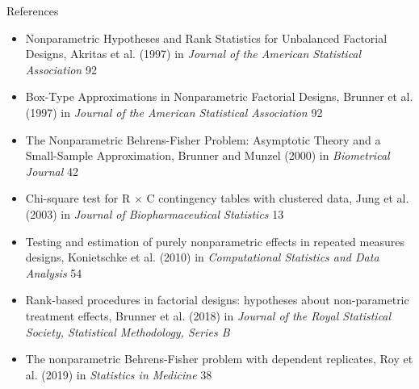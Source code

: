 \documentclass[xcolor=dvipsnames, aspectratio = 169]{beamer}
\begin{document}
\begin{frame}[fragile]{References}
	\begin{itemize}
	\setlength\itemsep{0em}
	\footnotesize
		\item Nonparametric Hypotheses and Rank Statistics for Unbalanced Factorial Designs, Akritas et al. (1997) in \textit{Journal of the American Statistical Association} 92
		\item Box-Type Approximations in Nonparametric Factorial Designs, Brunner et al. (1997) in \textit{Journal of the American Statistical Association} 92
		\item The Nonparametric Behrens-Fisher Problem: Asymptotic Theory and a Small-Sample Approximation, Brunner and Munzel (2000) in \textit{Biometrical Journal} 42
		\item Chi-square test for R $\times$ C contingency tables with clustered data, Jung et al. (2003) in \textit{Journal of Biopharmaceutical Statistics} 13
		\item Testing and estimation of purely nonparametric effects in repeated measures designs, Konietschke et al. (2010) in \textit{Computational Statistics and Data Analysis} 54
		\item Rank-based procedures in factorial designs: hypotheses about non-parametric treatment effects, Brunner et al. (2018) in \textit{Journal of the Royal Statistical Society, Statistical Methodology, Series B}
		\item The nonparametric Behrens-Fisher problem with dependent replicates, Roy et al. (2019) in \textit{Statistics in Medicine} 38
	\end{itemize}

\end{frame}
\end{document}
